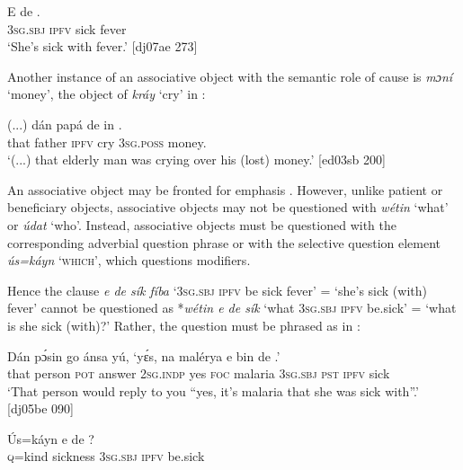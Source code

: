 \ea%
    \label{ex:key:1189}
    \gll E    de    .\\
\textsc{3sg.sbj}  \textsc{ipfv}  sick  fever\\

\glt ‘She’s sick with fever.’ [dj07ae 273]
\z

Another instance of an associative object with the semantic role of cause is \textit{mɔní} ‘money’, the object of \textit{kráy} ‘cry’ in :


\ea%
    \label{ex:key:1190}
    \gll (...)  dán  papá  de    in    .\\
  {} that  father  \textsc{ipfv}  cry    \textsc{3sg.poss}  money.\\

\glt ‘(...) that elderly man was crying over his (lost) money.’ [ed03sb 200]
\z

An associative object may be fronted for emphasis . However, unlike patient or beneficiary objects, associative objects may not be questioned with \textit{wétin} ‘what’ or \textit{údat} ‘who’. Instead, associative objects must be questioned with the corresponding adverbial question phrase or with the selective question element \textit{ús=káyn} ‘\textsc{which’}, which questions modifiers. 


Hence the clause \textit{e de sík fíba} \textsc{‘3sg.sbj} \textsc{ipfv} be sick fever’ = ‘she’s sick (with) fever’ cannot be questioned as *\textit{wétin e de sík} ‘what \textsc{3sg.sbj} \textsc{ipfv} be.sick’ = ‘what is she sick (with)?’ Rather, the question must be phrased as in :



\ea%
    \label{ex:key:1191}
    \gll Dán    pɔ́sin  go  ánsa    yú,      ‘yɛ́s,    na  malérya
e    bin  de  .’\\
that    person  \textsc{pot}  answer  \textsc{2sg.indp}    yes    \textsc{foc}  malaria
\textsc{3sg.sbj}  \textsc{pst}  \textsc{ipfv}  sick\\

\glt ‘That person would reply to you “yes, it’s malaria that 
she was sick with”.’ [dj05be 090]
\z


\ea%
    \label{ex:key:1192}
    \gll \'{U}s=káyn      e    de  ? \\
\textsc{q}=kind  sickness  \textsc{3sg.sbj}  \textsc{ipfv}  be.sick\\

